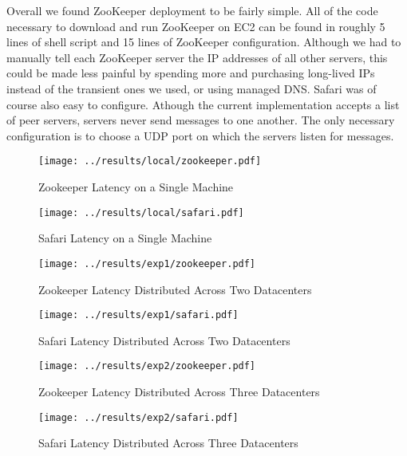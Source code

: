 Overall we found ZooKeeper deployment to be fairly simple. All of the code necessary to download and
run ZooKeeper on EC2 can be found in roughly 5 lines of shell script and 15 lines of ZooKeeper
configuration. Although we had to manually tell each ZooKeeper server the IP addresses of all other
servers, this could be made less painful by spending more and purchasing long-lived IPs instead of
the transient ones we used, or using managed DNS. Safari was of course also easy to configure.
Athough the current implementation accepts a list of peer servers, servers never send messages to
one another. The only necessary configuration is to choose a UDP port on which the servers listen
for messages.

\begin{figure}[h]
  \caption{Zookeeper Latency on a Single Machine}
  \centering
  \texttt{[image: ../results/local/zookeeper.pdf]}
\end{figure}

\begin{figure}[h]
  \caption{Safari Latency on a Single Machine}
  \centering
  \texttt{[image: ../results/local/safari.pdf]}
\end{figure}


\begin{figure}[h]
  \caption{Zookeeper Latency Distributed Across Two Datacenters}
  \centering
  \texttt{[image: ../results/exp1/zookeeper.pdf]}
\end{figure}

\begin{figure}[h]
  \caption{Safari Latency Distributed Across Two Datacenters}
  \centering
  \texttt{[image: ../results/exp1/safari.pdf]}
\end{figure}

\begin{figure}[h]
  \caption{Zookeeper Latency Distributed Across Three Datacenters}
  \centering
  \texttt{[image: ../results/exp2/zookeeper.pdf]}
\end{figure}

\begin{figure}[h]
  \caption{Safari Latency Distributed Across Three Datacenters}
  \centering
  \texttt{[image: ../results/exp2/safari.pdf]}
\end{figure}


